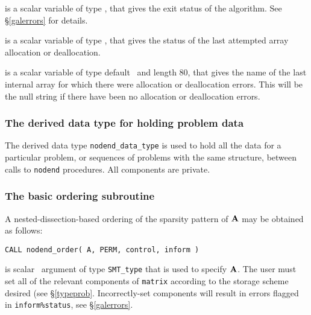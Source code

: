 \documentclass{galahad}
\newcommand{\packagename}{nodend}
\begin{document}
\begin{description}

 is a scalar variable of type \integer, that gives the
exit status of the algorithm.
See \S\ref{galerrors}
for details.

 is a scalar variable of type \integer, that gives
the status of the last attempted array allocation or deallocation.

 is a scalar variable of type default \character\
and length 80, that  gives the name of the last internal array
for which there were allocation or deallocation errors.
This will be the null string if there have been no
allocation or deallocation errors.


\subsubsection{The derived data type for holding problem data}\label{typedata}
The derived data type
{\tt \packagename\_data\_type}
is used to hold all the data for a particular problem,
or sequences of problems with the same structure, between calls to
{\tt \packagename} procedures.
All components are private.


\galarguments


\subsubsection{The basic ordering subroutine}\label{subinit}
A nested-dissection-based ordering of the sparsity pattern of ${\mathbf{A}}$ 
may be obtained as follows:

\hskip0.5in
{\tt CALL \packagename\_order( A, PERM, control, inform )}
\begin{description}
 is scalar \intentin\ argument of type {\tt SMT\_type}
that is used to specify ${\mathbf{A}}$.
The user must set all of the relevant components of {\tt matrix} according
to the storage scheme desired (see \S\ref{typeprob}.
Incorrectly-set components will result in errors
flagged in {\tt inform\%status}, see \S\ref{galerrors}.


\end{description}
\end{description}
\end{document}
